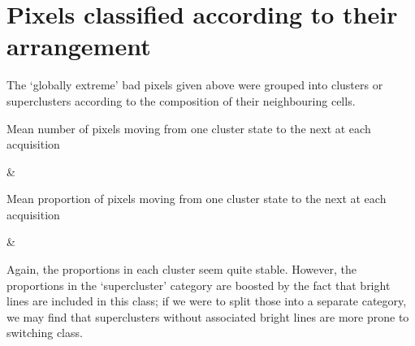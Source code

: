 \documentclass[10pt,fleqn]{article}
\begin{document}
\clearpage

\section{Pixels classified according to their arrangement}

The `globally extreme' bad pixels given above were grouped into clusters or superclusters according to the composition of their neighbouring cells.

\begin{table}[!ht]
\caption{Mean number of pixels moving from one cluster state to the next at each acquisition}

\begin{footnotesize}
%
		{& \csvlinetotablerow}%
\end{footnotesize}
\end{table}

\begin{table}[!ht]
\caption{Mean proportion of pixels moving from one cluster state to the next at each acquisition}

\begin{footnotesize}
%
		{& \csvlinetotablerow}%
\end{footnotesize}
\end{table}

Again, the proportions in each cluster seem quite stable. However, the proportions in the `supercluster' category are boosted by the fact that bright lines are included in this class; if we were to split those into a separate category, we may find that superclusters without associated bright lines are more prone to switching class.
\end{document}

